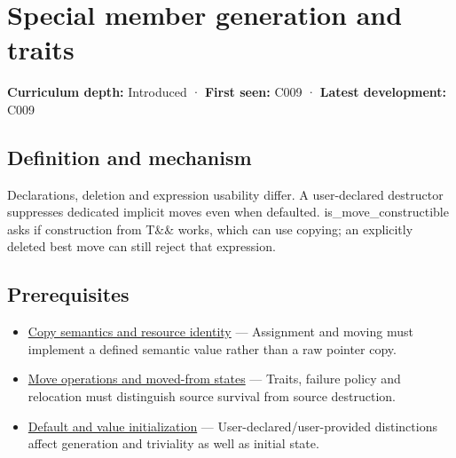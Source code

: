 \hypertarget{appendix-42e02a12c694}{}\label{referencestart:appendix-42e02a12c694}
\section{Special member generation and traits}\label{appendix-42e02a12c694-special-member-generation-and-traits}

\hypertarget{appendix-42e02a12c694-special-member-generation-and-traits}{}

\textbf{Curriculum depth:} Introduced · \textbf{First seen:} C009 · \textbf{Latest development:} C009

\begin{allmightroledefinition}

\subsection{Definition and mechanism}\label{appendix-42e02a12c694-definition-and-mechanism}

\hypertarget{appendix-42e02a12c694-definition-and-mechanism}{}

Declarations, deletion and expression usability differ. A user-declared destructor suppresses dedicated implicit moves even when defaulted. is\_move\_constructible asks if construction from T\&\& works, which can use copying; an explicitly deleted best move can still reject that expression.

\end{allmightroledefinition}

\subsection{Prerequisites}\label{appendix-42e02a12c694-prerequisites}

\hypertarget{appendix-42e02a12c694-prerequisites}{}

\begin{itemize}
\tightlist
\item
  \hyperref[appendix-1340cd1ce582]{Copy semantics and resource identity} --- Assignment and moving must implement a defined semantic value rather than a raw pointer copy.
\item
  \hyperref[appendix-5636651017c2]{Move operations and moved-from states} --- Traits, failure policy and relocation must distinguish source survival from source destruction.
\item
  \hyperref[appendix-ba8c1a9fe03f]{Default and value initialization} --- User-declared/user-provided distinctions affect generation and triviality as well as initial state.
\end{itemize}

